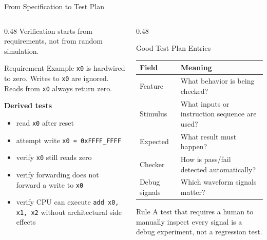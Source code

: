 \documentclass[aspectratio=169,10pt]{beamer}
\begin{document}
\begin{frame}{From Specification to Test Plan}
  \begin{columns}[T]
    \begin{column}{0.48\textwidth}
      Verification starts from requirements, not from random simulation.

      \vspace{0.6em}
      \begin{block}{Requirement Example}
        \texttt{x0} is hardwired to zero. Writes to \texttt{x0} are ignored. Reads from \texttt{x0} always return zero.
      \end{block}

      \vspace{0.6em}
      \textbf{Derived tests}
      \begin{itemize}
        \item read \texttt{x0} after reset
        \item attempt write \texttt{x0 = 0xFFFF\_FFFF}
        \item verify \texttt{x0} still reads zero
        \item verify forwarding does not forward a write to \texttt{x0}
        \item verify CPU can execute \texttt{add x0, x1, x2} without architectural side effects
      \end{itemize}
    \end{column}
    \begin{column}{0.48\textwidth}
      \begin{block}{Good Test Plan Entries}
        \renewcommand{\arraystretch}{1.15}
        \scriptsize
        \begin{tabular}{p{2.0cm}p{4.4cm}}
          \toprule
          Field & Meaning \\
          \midrule
          Feature & What behavior is being checked? \\
          Stimulus & What inputs or instruction sequence are used? \\
          Expected & What result must happen? \\
          Checker & How is pass/fail detected automatically? \\
          Debug signals & Which waveform signals matter? \\
          \bottomrule
        \end{tabular}
      \end{block}

      \vspace{0.7em}
      \begin{exampleblock}{Rule}
        A test that requires a human to manually inspect every signal is a debug experiment, not a regression test.
      \end{exampleblock}
    \end{column}
  \end{columns}
\end{frame}
\end{document}
